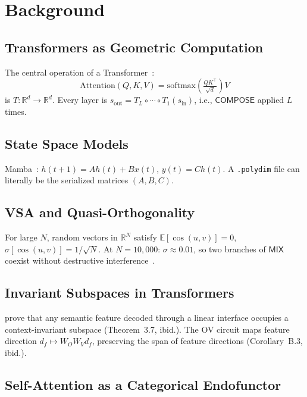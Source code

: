 \documentclass[10pt,twocolumn]{article}
\theoremstyle{plain}
\theoremstyle{definition}
\theoremstyle{remark}
\newcommand{\RR}{\mathbb{R}}
\newcommand{\Compose}{\mathsf{COMPOSE}}
\newcommand{\Mix}{\mathsf{MIX}}
\begin{document}
\section{Background}

\subsection{Transformers as Geometric Computation}

The central operation of a Transformer~\citep{vaswani2017}:
\[
  \mathrm{Attention}(Q,K,V) = \mathrm{softmax}\!\left(\tfrac{QK^\top}{\sqrt{d}}\right)V
\]
is $T\colon \RR^d \to \RR^d$. Every layer is
$s_{\mathrm{out}} = T_L \circ \cdots \circ T_1(s_{\mathrm{in}})$, i.e.,
$\Compose$ applied $L$ times.

\subsection{State Space Models}

Mamba~\citep{gu2023mamba}: $h(t{+}1) = Ah(t){+}Bx(t)$, $y(t){=}Ch(t)$.
A \texttt{.polydim} file can literally be the serialized matrices $(A,B,C)$.

\subsection{VSA and Quasi-Orthogonality}

For large $N$, random vectors in $\RR^N$ satisfy
$\mathbb{E}[\cos(u,v)]=0$, $\sigma[\cos(u,v)]=1/\sqrt{N}$.
At $N=10{,}000$: $\sigma\approx0.01$, so two branches of $\Mix$ coexist
without destructive interference~\citep{kanerva2009,frady2021}.

\subsection{Invariant Subspaces in Transformers}

\citet{suarez2026invariant} prove that any semantic feature decoded through a
linear interface occupies a context-invariant subspace (Theorem~3.7, ibid.).
The OV circuit maps feature direction $d_f \mapsto W_O W_V d_f$, preserving
the span of feature directions (Corollary~B.3, ibid.).

\subsection{Self-Attention as a Categorical Endofunctor}
\end{document}
